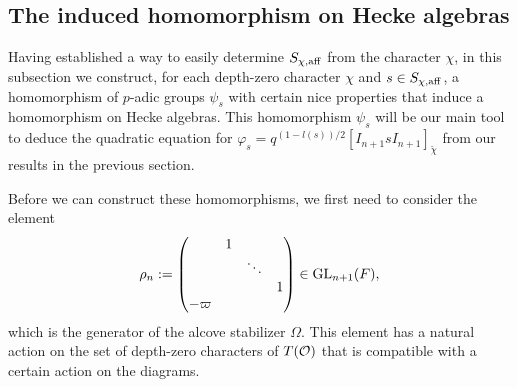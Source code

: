     \subsection{The induced homomorphism on Hecke algebras}

    Having established a way to easily determine $S_{\chi,\mathrm{aff}}$ from the character $\chi$, in this subsection we construct, for each depth-zero character $\chi$ and $s\in S_{\chi,\mathrm{aff}}$, a homomorphism of $p$-adic groups $\psi_s$ with certain nice properties that induce a homomorphism on Hecke algebras. This homomorphism $\psi_s$ will be our main tool to deduce the quadratic equation for $\varphi_s=q^{(1-l(s))/2}[I_{n+1}sI_{n+1}]_{\check{\chi}}$ from our results in the previous section.

    Before we can construct these homomorphisms, we first need to consider the element
    \begin{equation*}
        \rho_n:=
        \begin{pmatrix}
            &1&& \\
            &&\ddots& \\
            &&&1 \\
            -\varpi&&& 
        \end{pmatrix}
        \in\mathrm{GL}_{n+1}(F),
    \end{equation*}
    which is the generator of the alcove stabilizer $\Omega$. This element has a natural action on the set of depth-zero characters of $T(\mathcal{O})$ that is compatible with a certain action on the diagrams.


